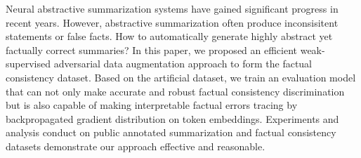 Neural abstractive summarization systems have gained significant progress in recent years. However, abstractive summarization often produce inconsisitent statements or false facts. How to automatically generate highly abstract yet factually correct summaries? In this paper, we proposed an efficient weak-supervised adversarial data augmentation approach to form the factual consistency dataset. Based on the artificial dataset, we train an evaluation model that can not only make accurate and robust factual consistency discrimination but is also capable of making interpretable factual errors tracing by backpropagated gradient distribution on token embeddings. Experiments and analysis conduct on public annotated summarization and factual consistency datasets demonstrate our approach effective and reasonable.
